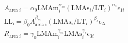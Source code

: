 \documentclass{article}
\begin{document}
\begin{align}

& A_{\mathrm{area} \; i}
= \alpha_0\mathrm{LMAm}_{i}^{\alpha_m} (\mathrm{LMAs}_{i}/ \mathrm{LT}_{i})^{\alpha_s}\epsilon_{1i}\\

& \mathrm{LL_i} = \beta_0 A_{\mathrm{area} \; i}^{\beta_m} ({\mathrm{LMAs}_{i}/\mathrm{LT}_{i}})^{\beta_s} \epsilon_{2i}\\

& R_{\mathrm{area} \; i}
= \gamma_0\mathrm{LMAm}_{i}^{\gamma_m} \mathrm{LMAs}_{i}^{\gamma_s} \epsilon_{3i}\\
\end{align}
\end{document}
